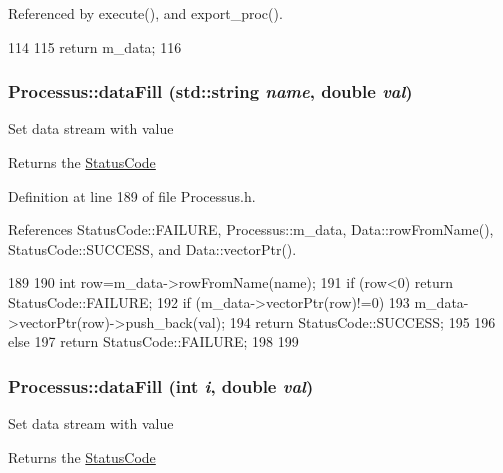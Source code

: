 Referenced by execute(), and export\_\-proc().


\begin{DoxyCode}
114               {
115     return m_data;
116   }
\end{DoxyCode}
\hypertarget{classProcessus_aa31ab71711f7af6a729441ff573f69c9}{
\subsubsection[{dataFill}]{ Processus::dataFill (std::string {\em name}, \/  double {\em val})}}
\label{classProcessus_aa31ab71711f7af6a729441ff573f69c9}
Set data stream with value \begin{DoxyReturn}{Returns}
the \hyperlink{classStatusCode}{StatusCode} 
\end{DoxyReturn}


Definition at line 189 of file Processus.h.

References StatusCode::FAILURE, Processus::m\_\-data, Data::rowFromName(), StatusCode::SUCCESS, and Data::vectorPtr().


\begin{DoxyCode}
189                                                  {
190     int row=m_data->rowFromName(name);
191     if (row<0) return StatusCode::FAILURE;
192     if (m_data->vectorPtr(row)!=0){
193       m_data->vectorPtr(row)->push_back(val);
194       return StatusCode::SUCCESS;
195     }
196     else {
197       return StatusCode::FAILURE;
198     }
199   }
\end{DoxyCode}
\hypertarget{classProcessus_a0d093b48f3218a088ba030e24372f18c}{
\subsubsection[{dataFill}]{ Processus::dataFill (int {\em i}, \/  double {\em val})}}
\label{classProcessus_a0d093b48f3218a088ba030e24372f18c}
Set data stream with value \begin{DoxyReturn}{Returns}
the \hyperlink{classStatusCode}{StatusCode} 
\end{DoxyReturn}


